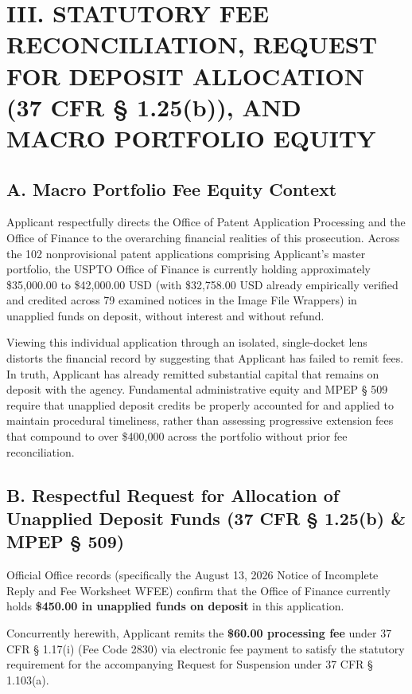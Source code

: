 \documentclass[11pt,letterpaper]{article}
\begin{document}
\section*{III. STATUTORY FEE RECONCILIATION, REQUEST FOR DEPOSIT ALLOCATION (37 CFR \S{} 1.25(b)), AND MACRO PORTFOLIO EQUITY}

\subsection*{A. Macro Portfolio Fee Equity Context}
Applicant respectfully directs the Office of Patent Application Processing and the Office of Finance to the overarching financial realities of this prosecution. Across the 102 nonprovisional patent applications comprising Applicant's master portfolio, the USPTO Office of Finance is currently holding approximately \$35,000.00 to \$42,000.00 USD (with \$32,758.00 USD already empirically verified and credited across 79 examined notices in the Image File Wrappers) in unapplied funds on deposit, without interest and without refund.

Viewing this individual application through an isolated, single-docket lens distorts the financial record by suggesting that Applicant has failed to remit fees. In truth, Applicant has already remitted substantial capital that remains on deposit with the agency. Fundamental administrative equity and MPEP \S{} 509 require that unapplied deposit credits be properly accounted for and applied to maintain procedural timeliness, rather than assessing progressive extension fees that compound to over \$400,000 across the portfolio without prior fee reconciliation.

\subsection*{B. Respectful Request for Allocation of Unapplied Deposit Funds (37 CFR \S{} 1.25(b) \& MPEP \S{} 509)}
Official Office records (specifically the August 13, 2026 Notice of Incomplete Reply and Fee Worksheet WFEE) confirm that the Office of Finance currently holds \textbf{\$450.00 in unapplied funds on deposit} in this application.

Concurrently herewith, Applicant remits the \textbf{\$60.00 processing fee} under 37 CFR \S{} 1.17(i) (Fee Code 2830) via electronic fee payment to satisfy the statutory requirement for the accompanying Request for Suspension under 37 CFR \S{} 1.103(a).
\end{document}
